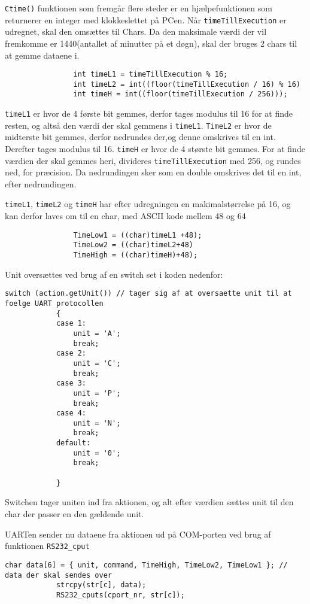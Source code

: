 \texttt{Ctime()} funktionen som fremgår flere steder er en hjælpefunktionen som returnerer en integer med klokkeslettet på PCen.
Når \texttt{timeTillExecution} er udregnet, skal den omsættes til Chars. Da den maksimale værdi der vil fremkomme er 1440(antallet af minutter på et døgn), skal der bruges 2 chars til at gemme dataene i.
\begin{lstlisting} 
				int timeL1 = timeTillExecution % 16; 
				int timeL2 = int((floor(timeTillExecution / 16) % 16)
				int timeH = int((floor(timeTillExecution / 256)));
\end{lstlisting} 
\texttt{timeL1} er hvor de 4 første bit gemmes, derfor tages modulus til 16 for at finde resten, og altså den værdi der skal gemmens i \texttt{timeL1}.
\texttt{TimeL2} er hvor de midterste bit gemmes, derfor nedrundes der,og denne omskrives til en int. Derefter tages modulus til 16.
\texttt{timeH} er hvor de 4 største bit gemmes. For at finde værdien der skal gemmes heri, divideres \texttt{timeTillExecution} med 256, og rundes ned, for præcision. Da nedrundingen sker som en double omskrives det til en int, efter nedrundingen.

\texttt{timeL1}, \texttt{timeL2} og \texttt{timeH} har efter udregningen en makimalstørrelse på 16, og kan derfor laves om til en char, med ASCII kode mellem 48 og 64
\begin{lstlisting} 
				TimeLow1 = ((char)timeL1 +48);
				TimeLow2 = ((char)timeL2+48)
				TimeHigh = ((char)timeH)+48);
\end{lstlisting} 

Unit oversættes ved brug af en switch set i koden nedenfor:
\begin{lstlisting} 
switch (action.getUnit()) // tager sig af at oversaette unit til at foelge UART protocollen
			{
			case 1:
				unit = 'A';
				break;
			case 2:
				unit = 'C';
				break;
			case 3:
				unit = 'P';
				break;
			case 4:
				unit = 'N';
				break;
			default: 
				unit = '0';
				break;

			}
\end{lstlisting} 
Switchen tager uniten ind fra aktionen, og alt efter værdien sættes unit til den char der passer en den gældende unit.

UARTen sender nu dataene fra aktionen ud på COM-porten ved brug af funktionen \texttt{RS232\_cput}

\begin{lstlisting}
char data[6] = { unit, command, TimeHigh, TimeLow2, TimeLow1 }; // data der skal sendes over
			strcpy(str[c], data);
			RS232_cputs(cport_nr, str[c]);
\end{lstlisting}

